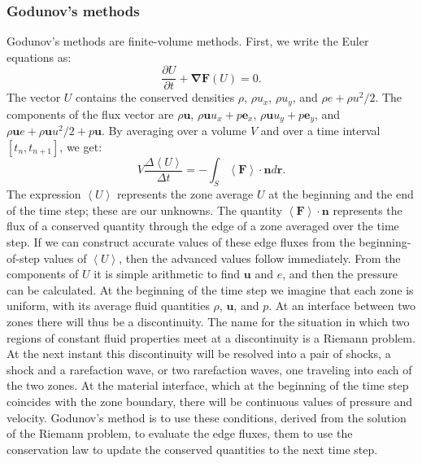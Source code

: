 \documentclass[letterpaper]{report}
\newcommand\bn{\boldsymbol{\nabla}}
\newcommand\br{\mathbf{r}}
\newcommand\la{\left\langle}
\newcommand\ra{\right\rangle}
\newcommand\bs{\boldsymbol}
\renewcommand{\(}{\left(}
\renewcommand{\)}{\right)}
\renewcommand{\[}{\left[}
\renewcommand{\]}{\right]}
\begin{document}
\subsubsection{Godunov's methods}
Godunov's methods are finite-volume methods. First, we write the Euler
equations as:
\begin{equation}
  \frac{\partial U}{\partial t} + \bn \bs{F}(U)=0.
\end{equation}
The vector $U$ contains the conserved densities $\rho$, $\rho u_x$, $\rho
u_y$, and $\rho e + \rho u^2/2$. The components of the flux vector are $\rho
\bs{u}$, $\rho \bs{u}u_x+ p\bs{e}_x$, $\rho \bs{u} u_y+p\bs{e}_y$, and $\rho
\bs{u} e +\rho \bs{u} u^2/2+p\bs{u}$. By averaging over a volume $V$ and over
a time interval $[t_n,t_{n+1}]$, we get:
\begin{equation}
  V\frac{\Delta \la U\ra}{\Delta t} = -\int_S\la \bs{F} \ra \cdot \bs{n} d\br.
\end{equation}
The expression $\la U \ra$ represents the zone average $U$ at the beginning
and the end of the time step; these are our unknowns. The quantity  $\la
\bs{F} \ra \cdot \bs{n}$ represents the flux of a conserved quantity through
the edge of a zone averaged over the time step. If we can construct accurate
values of these edge fluxes from the beginning-of-step values of $\la U \ra$,
then the advanced values follow immediately. From the components of $U$ it is
simple arithmetic to find $\bs{u}$ and $e$, and then the pressure can be
calculated. At the beginning of the time step we imagine that each zone is
uniform, with its average fluid quantities $\rho$, $\bs{u}$, and $p$. At an
interface between two zones there will thus be a discontinuity. The name for
the situation in which two regions of constant fluid properties meet at a
discontinuity is a Riemann problem. At the next instant this discontinuity
will be resolved into a pair of shocks, a shock and a rarefaction wave, or two
rarefaction waves, one traveling into each of the two zones. At the material
interface, which at the beginning of the time step coincides with the zone
boundary, there will be continuous values of pressure and velocity. Godunov's
method is to use these conditions, derived from the solution of the Riemann
problem, to evaluate the edge fluxes, them to use the conservation law to
update the conserved quantities to the next time step.
\end{document}
